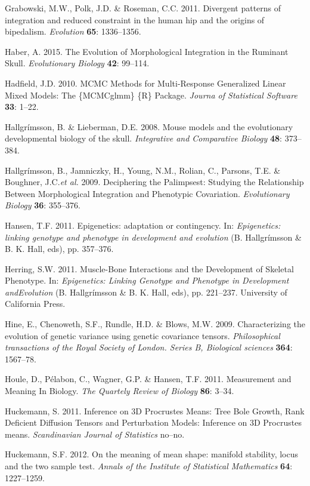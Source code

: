 \documentclass[12pt,twoside]{report}
\begin{document}
Grabowski, M.W., Polk, J.D. \& Roseman, C.C. 2011. Divergent patterns of
integration and reduced constraint in the human hip and the origins of
bipedalism. \emph{Evolution} \textbf{65}: 1336--1356.

Haber, A. 2015. The Evolution of Morphological Integration in the
Ruminant Skull. \emph{Evolutionary Biology} \textbf{42}: 99--114.

Hadfield, J.D. 2010. MCMC Methods for Multi-Response Generalized Linear
Mixed Models: The \{MCMCglmm\} \{R\} Package. \emph{Journa of
Statistical Software} \textbf{33}: 1--22.

Hallgrímsson, B. \& Lieberman, D.E. 2008. Mouse models and the
evolutionary developmental biology of the skull. \emph{Integrative and
Comparative Biology} \textbf{48}: 373--384.

Hallgrímsson, B., Jamniczky, H., Young, N.M., Rolian, C., Parsons, T.E.
\& Boughner, J.C.\emph{et al.} 2009. Deciphering the Palimpsest:
Studying the Relationship Between Morphological Integration and
Phenotypic Covariation. \emph{Evolutionary Biology} \textbf{36}:
355--376.

Hansen, T.F. 2011. Epigenetics: adaptation or contingency. In:
\emph{Epigenetics: linking genotype and phenotype in development and
evolution} (B. Hallgrímsson \& B. K. Hall, eds), pp. 357--376.

Herring, S.W. 2011. Muscle-Bone Interactions and the Development of
Skeletal Phenotype. In: \emph{Epigenetics: Linking Genotype and
Phenotype in Development andEvolution} (B. Hallgrímsson \& B. K. Hall,
eds), pp. 221--237. University of California Press.

Hine, E., Chenoweth, S.F., Rundle, H.D. \& Blows, M.W. 2009.
Characterizing the evolution of genetic variance using genetic
covariance tensors. \emph{Philosophical transactions of the Royal
Society of London. Series B, Biological sciences} \textbf{364}:
1567--78.

Houle, D., Pélabon, C., Wagner, G.P. \& Hansen, T.F. 2011. Measurement
and Meaning In Biology. \emph{The Quartely Review of Biology}
\textbf{86}: 3--34.

Huckemann, S. 2011. Inference on 3D Procrustes Means: Tree Bole Growth,
Rank Deficient Diffusion Tensors and Perturbation Models: Inference on
3D Procrustes means. \emph{Scandinavian Journal of Statistics} no--no.

Huckemann, S.F. 2012. On the meaning of mean shape: manifold stability,
locus and the two sample test. \emph{Annals of the Institute of
Statistical Mathematics} \textbf{64}: 1227--1259.
\end{document}
